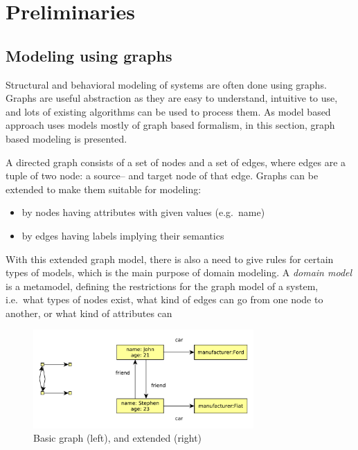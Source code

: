 
\chapter{Preliminaries}


\section{Modeling using graphs}

Structural and behavioral modeling of systems are often done using graphs. 
Graphs are useful abstraction as they are easy to understand, intuitive to use, and lots of existing algorithms can be used to process them. 
As model based approach uses models mostly of graph based formalism, in this section, graph based modeling is presented.

A directed graph consists of a set of nodes and a set of edges, where edges are a tuple of two node: a source-- and target node of that edge. 
Graphs can be extended to make them suitable for modeling:

\begin{itemize}
	\item by nodes having attributes with given values (e.g.\ name)
	\item by edges having labels implying their semantics
\end{itemize}

With this extended graph model, there is also a need to give rules for certain types of models, which is the main purpose of domain modeling.
A \emph{domain model} is a metamodel, defining the restrictions for the graph model of a system, i.e.\ what types of nodes exist, what kind of edges can go from one node to another, or what kind of attributes can

\begin{figure}[h]
	\begin{center}
		\includegraphics[width=0.75\textwidth]{figures/graphs.pdf}
		\caption{Basic graph (left), and extended (right) }
		\label{fig:graphs}
	\end{center}
\end{figure}


